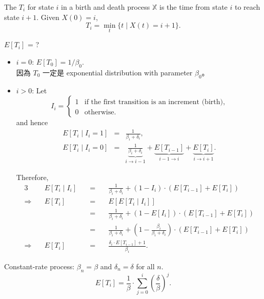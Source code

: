 \begin{definition}
The  $ T_{i} $ for state $ i $ in a birth and death process $ \mathbb{X} $ is the time from state $ i $ to reach state $ i + 1 $. Given $ X(0) = i $,
\[ T_{i} = \min_{t} \{ t \mid X(t) = i + 1 \}. \]
\end{definition}

\begin{question}
$ E[T_{i}] $ = ?

\begin{itemize}
\item $ i = 0 $: $ E[T_{0}] = 1 / \beta_{0} $. \\
  因為 $ T_{0} $ 一定是 exponential distribution with parameter $ \beta_{0} $。

\item $ i > 0 $: Let
\[ I_{i} = \begin{cases}
1 & \text{if the first transition is an increment (birth),} \\
0 & \text{otherwise.}
\end{cases} \]
and hence
\begin{eqnarray*}
E[T_{i} \mid I_{i} = 1] & = & \frac{1}{\beta_{i} + \delta_{i}}, \\
E[T_{i} \mid I_{i} = 0] & = & \underbrace{\frac{1}{\beta_{i} + \delta_{i}}}_{i \to i - 1} + \underbrace{E[T_{i - 1}]}_{i - 1 \to i} + \underbrace{E[T_{i}]}_{i \to i + 1}.
\end{eqnarray*}

Therefore,
\begin{alignat*}{3}
  & E[T_{i} \mid I_{i}]
    & \quad=\quad & \frac{1}{\beta_{i} + \delta_{i}} + (1 - I_{i}) \cdot (E[T_{i - 1}] + E[T_{i}]) \\
\Rightarrow\quad
  & E[T_{i}]
    & \quad=\quad & E[E[T_{i} \mid I_{i}]] \\
  & & \quad=\quad & \frac{1}{\beta_{i} + \delta_{i}} + (1 - E[I_{i}]) \cdot (E[T_{i - 1}] + E[T_{i}]) \\
  & & \quad=\quad & \frac{1}{\beta_{i} + \delta_{i}} + \left( 1 - \frac{\beta_{i}}{\beta_{i} + \delta_{i}} \right) \cdot (E[T_{i - 1}] + E[T_{i}]) \\
\Rightarrow\quad
  & E[T_{i}]
    & \quad=\quad & \frac{\delta_{i} \cdot E[T_{i - 1}] + 1}{\beta_{i}}.
\end{alignat*}
\end{itemize}
\end{question}

\begin{example}
Constant-rate process: $ \beta_{n} = \beta $ and $ \delta_{n} = \delta $ for all $ n $.
\[ E[T_{i}] = \frac{1}{\beta} \cdot \sum_{j = 0}^{i} \left( \frac{\delta}{\beta} \right)^{j}. \]
\end{example}
